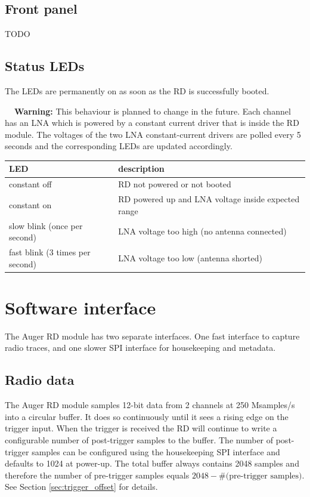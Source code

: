\documentclass[a4paper,indent]{paper}
\newenvironment{warning}
{\par\begin{mdframed}[linewidth=2pt,linecolor=orange,backgroundcolor=orange!10]%
    \begin{list}{}{\leftmargin=0mm}\item[\bf\danger{}~~Warning: ]}
  {\end{list}\end{mdframed}\par}
\begin{document}
\subsection{Front panel}
TODO

\subsection{Status LEDs}
The LEDs are permanently on as soon as the RD is successfully booted.

\begin{warning}
  This behaviour is planned to change in the future.
  Each channel has an LNA which is powered by a constant current driver that is inside the RD module.
  The voltages of the two LNA constant-current drivers are polled every 5 seconds and the corresponding LEDs are updated accordingly.
  \begin{tabular}{l|l}
    LED & description \\\hline
    constant off & RD not powered or not booted \\
    constant on  & RD powered up and LNA voltage inside expected range \\
    slow blink (once per second) & LNA voltage too high (no antenna connected) \\
    fast blink (3 times per second) & LNA voltage too low (antenna shorted)\\
  \end{tabular}
  
\end{warning}



\section{Software interface}
The Auger \ac{RD} module has two separate interfaces.
One fast interface to capture radio traces, and one slower \ac{SPI} interface for housekeeping and metadata. 

\subsection{Radio data}
The Auger \ac{RD} module samples 12-bit data from 2 channels at 250 Msamples/s into a circular buffer.
It does so continuously until it sees a rising edge on the trigger input.
When the trigger is received the \ac{RD} will continue to write a configurable number of post-trigger samples to the buffer.
The number of post-trigger samples can be configured using the housekeeping \ac{SPI} interface and defaults to 1024 at power-up.
The total buffer always contains 2048 samples and therefore the number of pre-trigger samples equals $2048-\text{\#(pre-trigger samples)}$.
See Section \ref{sec:trigger_offset} for details. 
\end{document}
